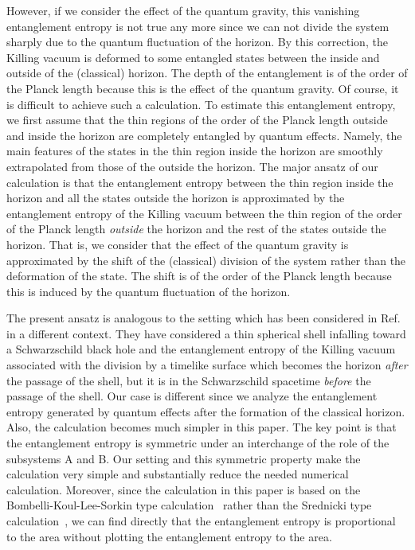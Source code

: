 \documentclass[12pt,epsf]{article}
\begin{document}
However, if we consider the effect of the quantum gravity,
this vanishing entanglement entropy is not true any more
since we can not divide the system sharply due to
the quantum fluctuation of the horizon.
By this correction, the Killing vacuum is deformed
to some entangled states between the inside and outside
of the (classical) horizon.
The depth of the entanglement is of the order of the
Planck length because this is the effect of the quantum gravity.
Of course, it is difficult to achieve such a calculation.
To estimate this entanglement entropy,
we first assume that the thin regions 
of the order of the Planck length outside and inside the horizon
are completely entangled by quantum effects.
Namely, the main features of the states in the thin region
inside the horizon are smoothly extrapolated from
those of the outside the horizon.
The major ansatz of our calculation is that
the entanglement entropy between the thin region
inside the horizon and all the states outside the horizon
is approximated by the entanglement entropy
of the Killing vacuum between
the thin region of the order of the Planck length
{\em outside} the horizon and the rest of
the states outside the horizon.
That is, we consider that the effect of the quantum gravity
is approximated by the shift of
the (classical) division of the system
rather than the deformation of the state.
The shift is of the order of the Planck length
because this is induced by
the quantum fluctuation of the horizon.

The present ansatz is analogous to the setting
which has been considered in Ref.\cite{MuSeKo98}
in a different context.
They have considered a thin spherical shell infalling
toward a Schwarzschild black hole and
the entanglement entropy of the Killing vacuum
associated with the division by a timelike surface
which becomes the horizon {\em after} the passage of the shell,
but it is in the Schwarzschild spacetime {\em before}
the passage of the shell.
Our case is different since we analyze the
entanglement entropy generated by quantum effects
after the formation of the classical horizon.
Also, the calculation becomes much simpler
in this paper.
The key point is that the entanglement entropy is symmetric
under an interchange of the role of the subsystems A and B.
Our setting and this symmetric property
make the calculation very simple and
substantially reduce the needed numerical calculation.
Moreover, since the calculation in this paper is
based on the Bombelli-Koul-Lee-Sorkin
type calculation~\cite{BKLS86}
rather than the Srednicki type calculation~\cite{Sredni93},
we can find directly that the entanglement entropy
is proportional to the area
without plotting the entanglement entropy to the area.
\end{document}
